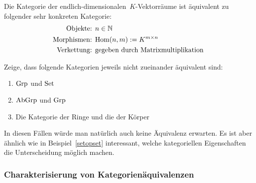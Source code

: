 \begin{bsp}Die Kategorie der endlich-dimensionalen~$K$-Vektorräume ist
äquivalent zu folgender sehr konkreten Kategorie:
\begin{align*}
  \text{Objekte: } & n \in \mathbb{N} \\
  \text{Morphismen: } & \mathrm{Hom}(n,m) := K^{m \times n} \\
  \text{Verkettung: } & \text{gegeben durch Matrixmultiplikation}
\end{align*}
\end{bsp}

\begin{aufg}Zeige, dass folgende
Kategorien jeweils nicht zueinander äquivalent sind:
\begin{enumerate}
\item $\mathrm{Grp}$ und $\mathrm{Set}$
\item $\mathrm{AbGrp}$ und $\mathrm{Grp}$
\item Die Kategorie der Ringe und die der Körper
\end{enumerate}
In diesen Fällen würde man natürlich auch keine Äquivalenz erwarten. Es ist
aber ähnlich wie in Beispiel~\ref{setopset} interessant, welche kategoriellen
Eigenschaften die Unterscheidung möglich machen.
\end{aufg}


\subsubsection*{Charakterisierung von Kategorienäquivalenzen}

